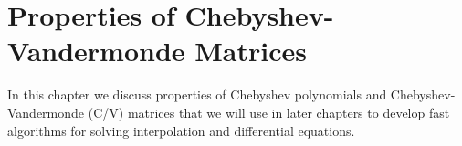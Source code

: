 \chapter{Properties of Cheby\-shev-Vander\-monde Ma\-trices}
\label{chap:CV_Prop}

In this chapter we discuss properties of Chebyshev polynomials
and Chebyshev-Vander\-monde (C\-/V) matrices that we will
use in later chapters to develop fast algorithms for
solving interpolation and differential equations.















